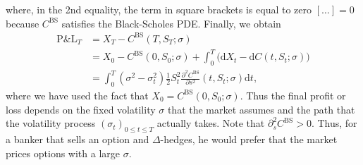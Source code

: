 \documentclass[12pt]{book}
\numberwithin{equation}{chapter}
\theoremstyle{plain}
\numberwithin{theorem}{section}
\theoremstyle{definition}
\numberwithin{exercise}{chapter}
\newcommand{\<}{\langle}
\renewcommand{\>}{\rangle}
\renewcommand{\(}{\left(}
\renewcommand{\)}{\right)}
\renewcommand{\[}{\left[}
\renewcommand{\]}{\right]}
\newcommand\sig{\sigma}
\renewcommand\d{\partial}
\newcommand\dd{\mathrm{d}}
\newcommand\BS{\textrm{BS}}
\theoremstyle{definition}
\numberwithin{question}{section}
\begin{document}
where, in the 2nd equality, the term in square brackets is equal to zero $\[ \ldots \] = 0$ because $C^\BS$ satisfies the Black-Scholes PDE.  Finally, we obtain
\begin{align}
\text{P\&L}_T 
	&= X_T - C^\BS(T,S_T;\sig) \\
	&= X_0 - C^\BS(0,S_0;\sig) + \int_0^T \big( \dd X_t - \dd C(t,S_t;\sig) \big) \\
	&= \int_0^T \(\sigma^2 - \sigma_t^2\) \frac{1}{2} S_t^2 \frac{\d^2 C^{\text{BS}}}{\d s^2} (t, S_t; \sigma) \dd t ,
\end{align}
where we have used the fact that $X_0 = C^\BS(0,S_0;\sig)$.  Thus the final profit or loss depends on the fixed volatility $\sig$ that the market assumes and the path that the volatility process $(\sig_t)_{0 \leq t \leq T}$ actually takes.  Note that $\d_s^2 C^\BS > 0$.  Thus, for a banker that sells an option and $\Delta$-hedges, he would prefer that the market prices options with a large $\sig$.
\end{document}
